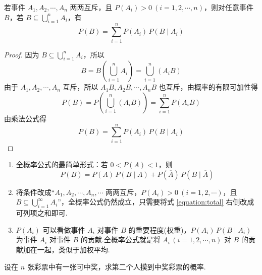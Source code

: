 \begin{theorem}[][全概率公式]
    \indent 若事件 $A_1,A_2,\cdots,A_n$ 两两互斥，且 $P(A_i)>0 \ (i=1,2,\cdots,n)$，则对任意事件 $B$，若 $B \subseteq \displaystyle\bigcup_{i=1}^n A_i$，有
    \begin{equation} \label{equation:total}
        P(B) = \sum_{i=1}^n P(A_i) \, P(B \mid A_i)
    \end{equation}
\end{theorem}

\begin{proof}
    因为 $B \subseteq \displaystyle\bigcup_{i=1}^n A_i$，所以
    $$
    B = B \left( \bigcup_{i=1}^n A_i \right) = \bigcup_{i=1}^n(A_i B)
    $$
    由于 $A_1,A_2,\cdots,A_n$ 互斥，所以 $A_1 B, A_2 B, \cdots, A_n B$ 也互斥，由概率的有限可加性得
    $$
    P(B) = P \left( \bigcup_{i=1}^n (A_i B) \right) = \sum_{i=1}^n P(A_i B)
    $$
    由乘法公式得
    $$
    P(B) = \sum_{i=1}^n P(A_i) \, P(B \mid A_i)
    $$

    \vspace{-2em}
\end{proof}

\begin{note}
    \begin{enumerate}
        \item 全概率公式的最简单形式：若 $0 < P(A) < 1$，则
        $$
        P(B) = P(A) \, P(B \mid A) + P(\overline{A}) \, P(B \mid \overline{A})
        $$
        \item 将条件改成“$A_1, A_2, \cdots, A_n, \cdots$ 两两互斥，$P(A_i)>0 \ (i=1,2,\cdots)$，且 $B \subseteq \displaystyle\bigcup_{i=1}^{\infty} A_i$”，全概率公式仍然成立，只需要将式 \eqref{equation:total} 右侧改成可列项之和即可.
        \item $P(A_i)$ 可以看做事件 $A_i$ 对事件 $B$ 的重要程度(权重)，$P(A_i) \, P(B \mid A_i)$ 为事件 $A_i$ 对事件 $B$ 的贡献.全概率公式就是将 $A_i \, (i=1,2,\cdots,n)$ 对 $B$ 的贡献加在一起，类似于加权平均.
    \end{enumerate}
\end{note}

\begin{example}
    \indent 设在 $n$ 张彩票中有一张可中奖，求第二个人摸到中奖彩票的概率.
\end{example}


